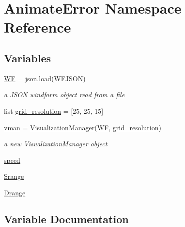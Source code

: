 \hypertarget{namespace_animate_error}{}\section{Animate\+Error Namespace Reference}
\label{namespace_animate_error}
\subsection*{Variables}
\begin{DoxyCompactItemize}
\item 
\mbox{\hyperlink{namespace_animate_error_a25b033c46671da0b48bee3587cf370c1}{WF}} = json.\+load(W\+F\+J\+S\+ON)
\begin{DoxyCompactList}\small\item\em a J\+S\+ON windfarm object read from a file \end{DoxyCompactList}\item 
list \mbox{\hyperlink{namespace_animate_error_a80b6ca5f039907594eec504621ef9574}{grid\+\_\+resolution}} = \mbox{[}25, 25, 15\mbox{]}
\item 
\mbox{\hyperlink{namespace_animate_error_a7c61e5c3dcf8f34394aafe41966b8bf5}{vman}} = \mbox{\hyperlink{classvisualization__manager___d_j_1_1_visualization_manager}{Visualization\+Manager}}(\mbox{\hyperlink{namespace_animate_error_a25b033c46671da0b48bee3587cf370c1}{WF}}, \mbox{\hyperlink{namespace_animate_error_a80b6ca5f039907594eec504621ef9574}{grid\+\_\+resolution}})
\begin{DoxyCompactList}\small\item\em a new Visualization\+Manager object \end{DoxyCompactList}\item 
\mbox{\hyperlink{namespace_animate_error_a7ee7380c6a63ebc4f737cf5d999f9899}{speed}}
\item 
\mbox{\hyperlink{namespace_animate_error_ac77d30dc25adc76497daa19a97612665}{Srange}}
\item 
\mbox{\hyperlink{namespace_animate_error_a88fe8948bcdf9547a6047170052b1308}{Drange}}
\end{DoxyCompactItemize}


\subsection{Variable Documentation}
\mbox{\label{namespace_animate_error_a88fe8948bcdf9547a6047170052b1308}} 

